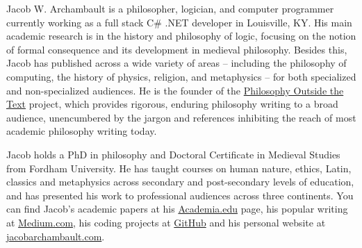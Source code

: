 \documentclass[]{article}
\begin{document}
Jacob W. Archambault is a philosopher, logician, and computer programmer currently working as a full stack C\# .NET developer in Louisville, KY. His main academic research is in the history and philosophy of logic, focusing on the notion of formal consequence and its development in medieval philosophy. Besides this, Jacob has published across a wide variety of areas – including the philosophy of computing, the history of physics, religion, and metaphysics – for both specialized and non-specialized audiences. He is the founder of the \href{https://medium.com/philosophy-outside-the-text}{Philosophy Outside the Text} project, which provides rigorous, enduring philosophy writing to a broad audience, unencumbered by the jargon and references inhibiting the reach of most academic philosophy writing today. 

Jacob holds a PhD in philosophy and Doctoral Certificate in Medieval Studies from Fordham University. He has taught courses on human nature, ethics, Latin, classics and metaphysics across secondary and post-secondary levels of education, and has presented his work to professional audiences across three continents.
You can find Jacob’s academic papers at his \href{https://fordham.academia.edu/JacobArchambault}{Academia.edu} page, his popular writing at \href{https://medium.com/@jacobarchambault}{Medium.com}, his coding projects at \href{https://github.com/JacobArchambault}{GitHub} and his personal website at \href{https://jacobarchambault.com}{jacobarchambault.com}.
\end{document}
